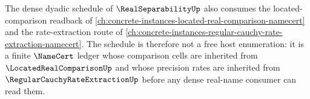 The dense dyadic schedule of $\RealSeparabilityUp$ also consumes the located-comparison readback of \autoref{ch:concrete-instances-located-real-comparison-namecert} and the rate-extraction route of \autoref{ch:concrete-instances-regular-cauchy-rate-extraction-namecert}. The schedule is therefore not a free host enumeration: it is a finite $\NameCert$ ledger whose comparison cells are inherited from $\LocatedRealComparisonUp$ and whose precision rates are inherited from $\RegularCauchyRateExtractionUp$ before any dense real-name consumer can read them.
